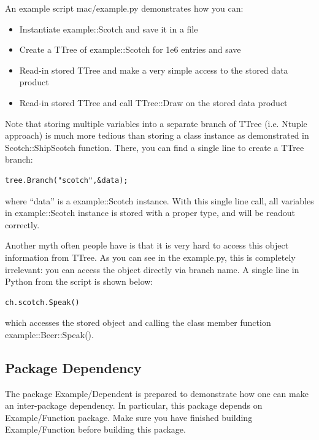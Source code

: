 An example script {\ttfamily mac/example.py} demonstrates how you can:
\begin{itemize}
\item Instantiate {\ttfamily example::Scotch} and save it in a \ROOT file
\item Create a {\ttfamily TTree} of {\ttfamily example::Scotch} for 1e6 entries and save
\item Read-in stored {\ttfamily TTree} and make a very simple access to the stored data product
\item Read-in stored {\ttfamily TTree} and call {\ttfamily TTree::Draw} on the stored data product
\end{itemize}

Note that storing multiple variables into a separate branch of {\ttfamily TTree} (i.e. Ntuple approach)
is much more tedious than storing a class instance as demonstrated in {\ttfamily Scotch::ShipScotch}
function. There, you can find a single line to create a {\ttfamily TTree} branch:
\begin{lstlisting}
tree.Branch("scotch",&data);
\end{lstlisting}
where ``data'' is a {\ttfamily example::Scotch} instance.
With this single line call, all variables in {\ttfamily example::Scotch} instance is stored
with a proper type, and will be readout correctly.

Another myth often people have is that it is very hard to access this object information from
{\ttfamily TTree}. As you can see in the {\ttfamily example.py}, this is completely irrelevant:
you can access the object directly via branch name. A single line in {\ttfamily Python} from
the script is shown below:
\begin{lstlisting}
ch.scotch.Speak()
\end{lstlisting}
which accesses the stored object and calling the class member function {\ttfamily example::Beer::Speak()}.

\subsection{Package Dependency}
The package {\ttfamily Example/Dependent} is prepared to demonstrate how one can make an inter-package 
dependency. In particular, this package depends on {\ttfamily Example/Function} package. Make sure
you have finished building {\ttfamily Example/Function} before building this package.

